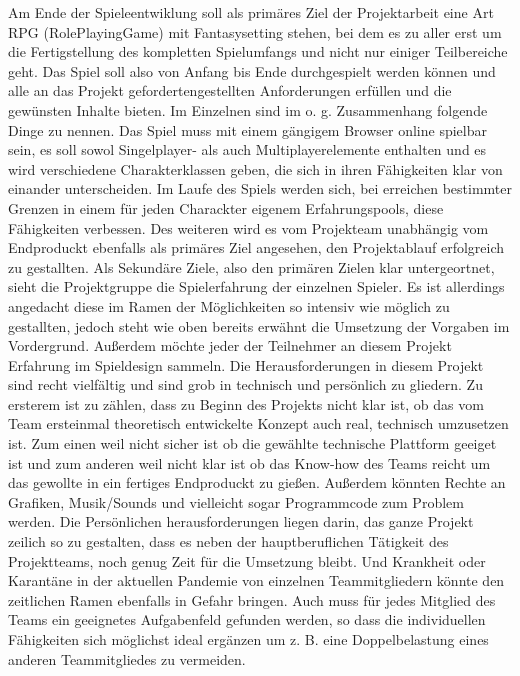 Am Ende der Spieleentwiklung soll als primäres Ziel der Projektarbeit eine Art RPG (RolePlayingGame) mit Fantasysetting stehen, bei dem es zu aller erst um die Fertigstellung des kompletten Spielumfangs und nicht nur einiger Teilbereiche geht. Das Spiel soll also von Anfang bis Ende durchgespielt werden können und alle an das Projekt gefordertengestellten Anforderungen erfüllen und die gewünsten Inhalte bieten. Im Einzelnen sind im o. g. Zusammenhang folgende Dinge zu nennen. Das Spiel muss mit einem gängigem Browser online spielbar sein, es soll sowol Singelplayer- als auch Multiplayerelemente enthalten und es wird verschiedene Charakterklassen geben, die sich in ihren Fähigkeiten klar von einander unterscheiden. Im Laufe des Spiels werden sich, bei erreichen bestimmter Grenzen in einem für jeden Charackter eigenem Erfahrungspools, diese Fähigkeiten verbessen. Des weiteren wird es vom Projekteam unabhängig vom Endproduckt ebenfalls als primäres Ziel angesehen, den Projektablauf erfolgreich zu gestallten.
Als Sekundäre Ziele, also den primären Zielen klar untergeortnet, sieht die Projektgruppe die Spielerfahrung der einzelnen Spieler. Es ist allerdings angedacht diese im Ramen der Möglichkeiten so intensiv wie möglich zu gestallten, jedoch steht wie oben bereits erwähnt die Umsetzung der Vorgaben im Vordergrund. Außerdem möchte jeder der Teilnehmer an diesem Projekt Erfahrung im Spieldesign sammeln.
Die Herausforderungen in diesem Projekt sind recht vielfältig und sind grob in technisch und persönlich zu gliedern. Zu ersterem ist zu zählen, dass zu Beginn des Projekts nicht klar ist, ob das vom Team ersteinmal theoretisch entwickelte Konzept auch real, technisch umzusetzen ist. Zum einen weil nicht sicher ist ob die gewählte technische Plattform geeiget ist und zum anderen weil nicht klar ist ob das Know-how des Teams reicht um das gewollte in ein fertiges Endproduckt zu gießen. Außerdem könnten Rechte an Grafiken, Musik/Sounds und vielleicht sogar Programmcode zum Problem werden. Die Persönlichen herausforderungen liegen darin, das ganze Projekt zeilich so zu gestalten, dass es neben der hauptberuflichen Tätigkeit des Projektteams, noch genug Zeit für die Umsetzung bleibt. Und Krankheit oder Karantäne in der aktuellen Pandemie von einzelnen Teammitgliedern könnte den zeitlichen Ramen ebenfalls in Gefahr bringen. Auch muss für jedes Mitglied des Teams ein geeignetes Aufgabenfeld gefunden werden, so dass die individuellen Fähigkeiten sich möglichst ideal ergänzen um z. B. eine Doppelbelastung eines anderen Teammitgliedes zu vermeiden. 



